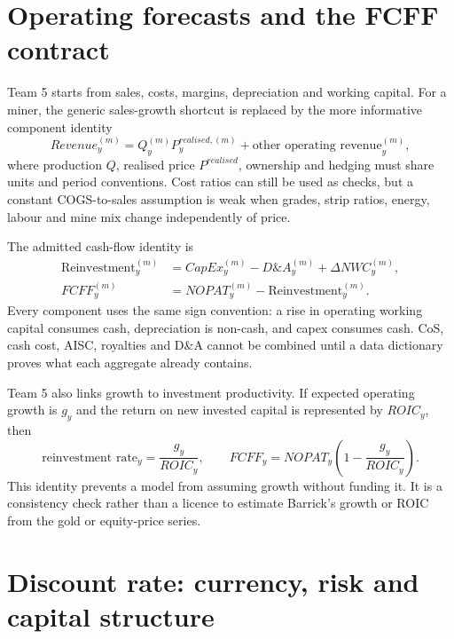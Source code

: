 \section{Operating forecasts and the FCFF contract}

Team 5 starts from sales, costs, margins, depreciation and working capital.
For a miner, the generic sales-growth shortcut is replaced by the more
informative component identity
\begin{equation}
Revenue_y^{(m)}=Q_y^{(m)}P_y^{realised,(m)}+\text{other operating revenue}_y^{(m)},
\end{equation}
where production \(Q\), realised price \(P^{realised}\), ownership and hedging
must share units and period conventions. Cost ratios can still be used as
checks, but a constant COGS-to-sales assumption is weak when grades, strip
ratios, energy, labour and mine mix change independently of price.

The admitted cash-flow identity is
\begin{align}
\text{Reinvestment}_y^{(m)}
  &=CapEx_y^{(m)}-D\&A_y^{(m)}+\Delta NWC_y^{(m)},\\
FCFF_y^{(m)}
  &=NOPAT_y^{(m)}-\text{Reinvestment}_y^{(m)}.
\end{align}
Every component uses the same sign convention: a rise in operating working
capital consumes cash, depreciation is non-cash, and capex consumes cash. CoS,
cash cost, AISC, royalties and D\&A cannot be combined until a data dictionary
proves what each aggregate already contains.

Team 5 also links growth to investment productivity. If expected operating
growth is \(g_y\) and the return on new invested capital is represented by
\(ROIC_y\), then
\begin{equation}
\text{reinvestment rate}_y=\frac{g_y}{ROIC_y},
\qquad
FCFF_y=NOPAT_y\left(1-\frac{g_y}{ROIC_y}\right).
\end{equation}
This identity prevents a model from assuming growth without funding it. It is
a consistency check rather than a licence to estimate Barrick's growth or
ROIC from the gold or equity-price series.

\section{Discount rate: currency, risk and capital structure}

